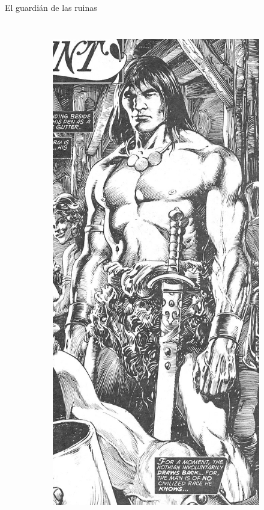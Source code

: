 \begin{frame}{El guardián de las ruinas}
\begin{columns}
\begin{figure}[htp]
\begin{subfigure}[b]{0.23\textwidth}
				\includegraphics[width=\textwidth]{img/conan/TSSC}
			\end{subfigure}
		\end{figure}
	\end{columns}
\end{frame}
\note[itemize]{
	\item
}

